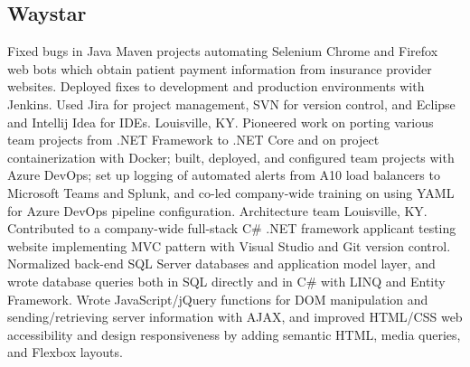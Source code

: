 \subsection{Waystar}
{Fixed bugs in Java Maven projects automating Selenium Chrome and Firefox web bots which obtain patient payment information from insurance provider websites. Deployed fixes to development and production environments with Jenkins. Used Jira for project management, SVN for version control, and Eclipse and Intellij Idea for IDEs.
}
{Louisville, KY. Pioneered work on porting various team projects from .NET Framework to .NET Core and on project containerization with Docker; built, deployed, and configured team projects with Azure DevOps; set up logging of automated alerts from A10 load balancers to Microsoft Teams and Splunk, and co-led company-wide training on using YAML for Azure DevOps pipeline configuration.
}
{Architecture team}
{}
{Louisville, KY. Contributed to a company-wide full-stack C\# .NET framework applicant testing website implementing MVC pattern with Visual Studio and Git version control. Normalized back-end SQL Server databases and application model layer, and wrote database queries both in SQL directly and in C\# with LINQ and Entity Framework. Wrote JavaScript/jQuery functions for DOM manipulation and sending/retrieving server information with AJAX, and improved HTML/CSS web accessibility and design responsiveness by adding semantic HTML, media queries, and Flexbox layouts. }
